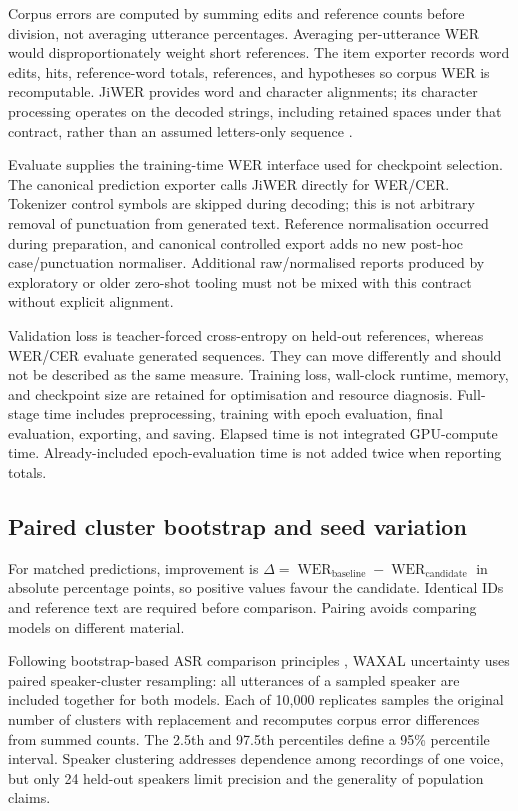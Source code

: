 \documentclass[12pt,a4paper]{report}
\begin{document}
Corpus errors are computed by summing edits and reference counts before division, not averaging utterance percentages. Averaging per-utterance WER would disproportionately weight short references. The item exporter records word edits, hits, reference-word totals, references, and hypotheses so corpus WER is recomputable. JiWER provides word and character alignments; its character processing operates on the decoded strings, including retained spaces under that contract, rather than an assumed letters-only sequence \citep{JiWER}.

Evaluate supplies the training-time WER interface used for checkpoint selection. The canonical prediction exporter calls JiWER directly for WER/CER. Tokenizer control symbols are skipped during decoding; this is not arbitrary removal of punctuation from generated text. Reference normalisation occurred during preparation, and canonical controlled export adds no new post-hoc case/punctuation normaliser. Additional raw/normalised reports produced by exploratory or older zero-shot tooling must not be mixed with this contract without explicit alignment.

Validation loss is teacher-forced cross-entropy on held-out references, whereas WER/CER evaluate generated sequences. They can move differently and should not be described as the same measure. Training loss, wall-clock runtime, memory, and checkpoint size are retained for optimisation and resource diagnosis. Full-stage time includes preprocessing, training with epoch evaluation, final evaluation, exporting, and saving. Elapsed time is not integrated GPU-compute time. Already-included epoch-evaluation time is not added twice when reporting totals.

\subsection{Paired cluster bootstrap and seed variation}

For matched predictions, improvement is $\Delta=\operatorname{WER}_{\mathrm{baseline}}-\operatorname{WER}_{\mathrm{candidate}}$ in absolute percentage points, so positive values favour the candidate. Identical IDs and reference text are required before comparison. Pairing avoids comparing models on different material.

Following bootstrap-based ASR comparison principles \citep{BisaniNey2004}, WAXAL uncertainty uses paired speaker-cluster resampling: all utterances of a sampled speaker are included together for both models. Each of 10,000 replicates samples the original number of clusters with replacement and recomputes corpus error differences from summed counts. The 2.5th and 97.5th percentiles define a 95\% percentile interval. Speaker clustering addresses dependence among recordings of one voice, but only 24 held-out speakers limit precision and the generality of population claims.
\end{document}

